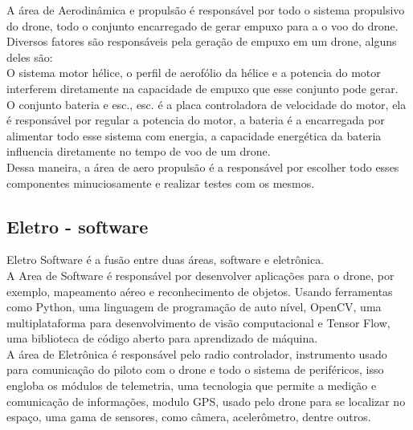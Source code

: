 A área de Aerodinâmica e propulsão é responsável por todo o sistema propulsivo do drone, todo o conjunto encarregado de gerar empuxo para a o voo do drone. \\[0.2cm]

Diversos fatores são responsáveis pela geração de empuxo em um drone, alguns deles são: \\[0.2cm]

O sistema motor hélice, o perfil de aerofólio da hélice e a potencia do motor interferem diretamente na capacidade de empuxo que esse conjunto pode gerar. \\[0.2cm]

O conjunto bateria e esc., esc. é a placa controladora de velocidade do motor, ela é responsável por regular a potencia do motor, a bateria é a encarregada por alimentar todo esse sistema com energia, a capacidade energética da bateria influencia diretamente no tempo de voo de um drone. \\[0.2cm]

Dessa maneira, a área de aero propulsão é a responsável por escolher todo esses componentes minuciosamente e realizar testes com os mesmos. \\[0.2cm]



\subsection{Eletro - software}



Eletro Software é a fusão entre duas áreas, software e eletrônica.  \\[0.2cm]

A Area de Software é responsável por desenvolver aplicações para o drone, por exemplo, mapeamento aéreo e reconhecimento de objetos. Usando ferramentas como Python, uma linguagem de programação de auto nível, OpenCV, uma multiplataforma para desenvolvimento de visão computacional e Tensor Flow, uma biblioteca de código aberto para aprendizado de máquina. \\[0.2cm]



A área de Eletrônica é responsável pelo radio controlador, instrumento usado para comunicação do piloto com o drone e todo o sistema de periféricos, isso engloba os módulos de telemetria,  uma tecnologia que permite a medição e comunicação de informações, modulo GPS, usado pelo drone para se localizar no espaço, uma gama de sensores, como câmera, acelerômetro, dentre outros. \\[0.2cm]

